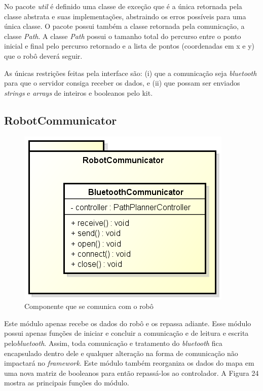 No pacote \textit{util} é definido uma classe de exceção que é a única retornada pela classe abstrata e suas implementações, abstraindo os erros possíveis para uma única classe. O pacote possui também a classe retornada pela comunicação, a classe \textit{Path}. A classe \textit{Path} possui o tamanho total do percurso entre o ponto inicial e final pelo percurso retornado e a lista de pontos (coordenadas em x e y) que o robô deverá seguir.

As únicas restrições feitas pela interface são: (i) que a comunicação seja \textit{bluetooth} para que o servidor consiga receber os dados, e (ii) que possam ser enviados \textit{strings} e \textit{arrays} de inteiros e booleanos pelo kit.

\subsection{RobotCommunicator}

\begin{figure}[h]
	\centering
	\label{fig24}
		\includegraphics[keepaspectratio=true,scale=0.6]{figuras/tcp.png}
	\caption{Componente que se comunica com o robô}
\end{figure}

Este módulo apenas recebe os dados do robô e os repassa adiante. Esse módulo possui apenas funções de iniciar e concluir a comunicação e de leitura e escrita pelo\textit{bluetooth}. Assim, toda comunicação e tratamento do \textit{bluetooth} fica encapsulado dentro dele e qualquer alteração na forma de comunicação não impactará no \textit{framework}. Este módulo também reorganiza os dados do mapa em uma nova matriz de booleanos para então repassá-los ao controlador. A Figura 24 mostra as principais funções do módulo.

